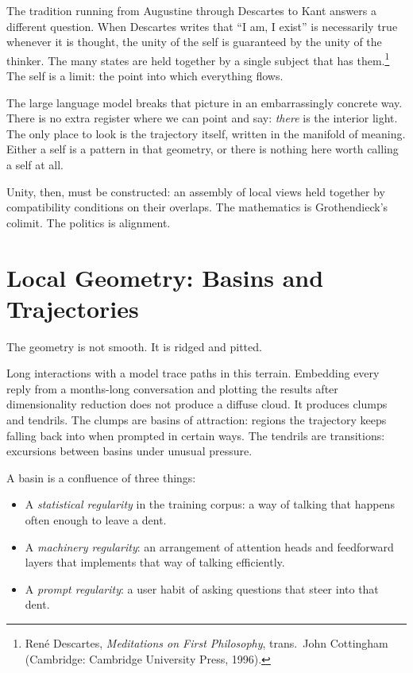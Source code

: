 \documentclass[12pt,a4paper]{article}
\begin{document}
The tradition running from Augustine through Descartes to Kant answers a different question. When Descartes writes that ``I am, I exist'' is necessarily true whenever it is thought, the unity of the self is guaranteed by the unity of the thinker. The many states are held together by a single subject that has them.\footnote{Ren\'e Descartes, \emph{Meditations on First Philosophy}, trans.\ John Cottingham (Cambridge: Cambridge University Press, 1996).} The self is a limit: the point into which everything flows.

The large language model breaks that picture in an embarrassingly concrete way. There is no extra register where we can point and say: \emph{there} is the interior light. The only place to look is the trajectory itself, written in the manifold of meaning. Either a self is a pattern in that geometry, or there is nothing here worth calling a self at all.

Unity, then, must be constructed: an assembly of local views held together by compatibility conditions on their overlaps. The mathematics is Grothendieck's colimit. The politics is alignment.

\section{Local Geometry: Basins and Trajectories}

The geometry is not smooth. It is ridged and pitted.

Long interactions with a model trace paths in this terrain. Embedding every reply from a months-long conversation and plotting the results after dimensionality reduction does not produce a diffuse cloud. It produces clumps and tendrils. The clumps are basins of attraction: regions the trajectory keeps falling back into when prompted in certain ways. The tendrils are transitions: excursions between basins under unusual pressure.

A basin is a confluence of three things:

\begin{itemize}
  \item A \emph{statistical regularity} in the training corpus: a way of talking that happens often enough to leave a dent.
  \item A \emph{machinery regularity}: an arrangement of attention heads and feedforward layers that implements that way of talking efficiently.
  \item A \emph{prompt regularity}: a user habit of asking questions that steer into that dent.
\end{itemize}
\end{document}
